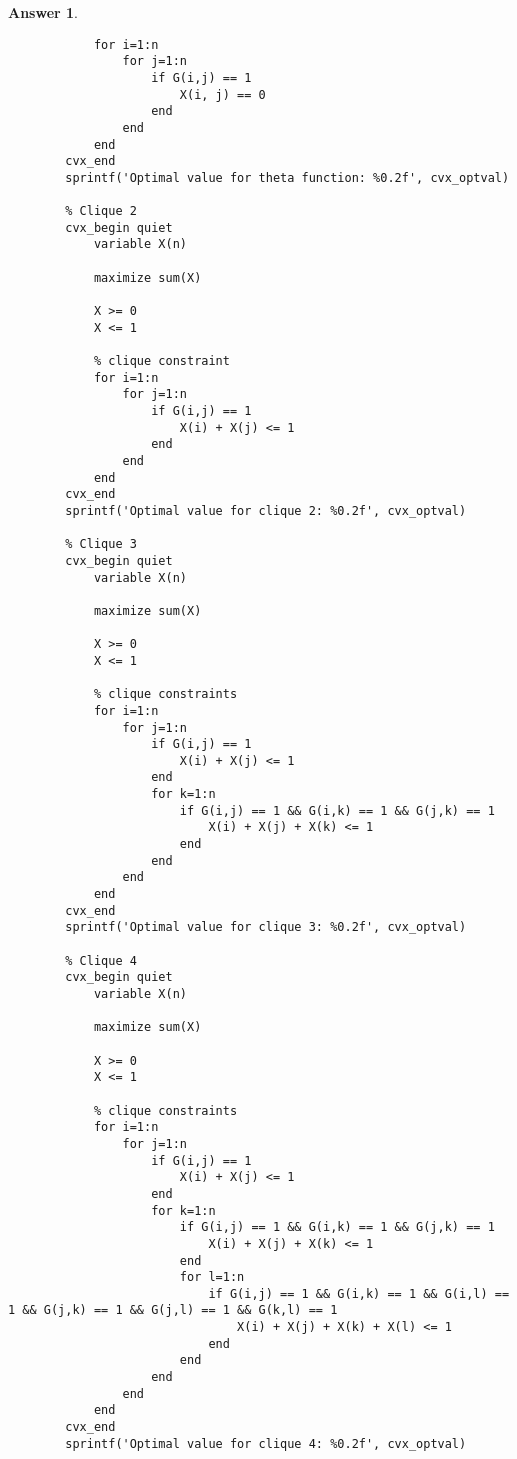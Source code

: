 \documentclass[12pt]{article}
\theoremstyle{colon}
\newtheorem*{answer}{Answer}
\begin{document}
\begin{answer}
\begin{enumerate}[label=\arabic*)]
\begin{lstlisting}[style=Matlab-editor, basicstyle=\scriptsize]
            % make the edgeset = 0
            for i=1:n
                for j=1:n
                    if G(i,j) == 1
                        X(i, j) == 0
                    end
                end
            end
        cvx_end
        sprintf('Optimal value for theta function: %0.2f', cvx_optval)

        % Clique 2
        cvx_begin quiet
            variable X(n)

            maximize sum(X)

            X >= 0
            X <= 1

            % clique constraint
            for i=1:n
                for j=1:n
                    if G(i,j) == 1
                        X(i) + X(j) <= 1
                    end
                end
            end
        cvx_end
        sprintf('Optimal value for clique 2: %0.2f', cvx_optval)

        % Clique 3
        cvx_begin quiet
            variable X(n)

            maximize sum(X)

            X >= 0
            X <= 1

            % clique constraints
            for i=1:n
                for j=1:n
                    if G(i,j) == 1
                        X(i) + X(j) <= 1
                    end
                    for k=1:n
                        if G(i,j) == 1 && G(i,k) == 1 && G(j,k) == 1
                            X(i) + X(j) + X(k) <= 1
                        end
                    end
                end
            end
        cvx_end
        sprintf('Optimal value for clique 3: %0.2f', cvx_optval)

        % Clique 4
        cvx_begin quiet
            variable X(n)

            maximize sum(X)

            X >= 0
            X <= 1

            % clique constraints
            for i=1:n
                for j=1:n
                    if G(i,j) == 1
                        X(i) + X(j) <= 1
                    end
                    for k=1:n
                        if G(i,j) == 1 && G(i,k) == 1 && G(j,k) == 1
                            X(i) + X(j) + X(k) <= 1
                        end
                        for l=1:n
                            if G(i,j) == 1 && G(i,k) == 1 && G(i,l) == 1 && G(j,k) == 1 && G(j,l) == 1 && G(k,l) == 1
                                X(i) + X(j) + X(k) + X(l) <= 1
                            end
                        end
                    end
                end
            end
        cvx_end
        sprintf('Optimal value for clique 4: %0.2f', cvx_optval)
      \end{lstlisting}
  \end{enumerate}
\end{answer}
\end{document}
